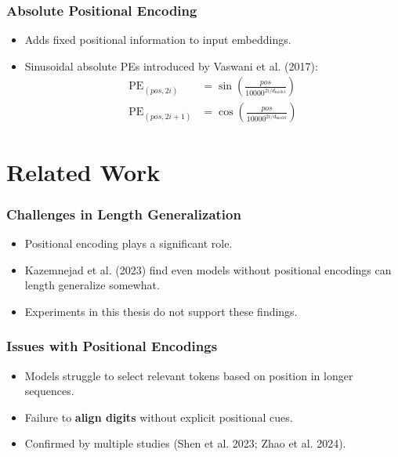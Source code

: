 \documentclass[14pt,aspectratio=169]{beamer}
\theoremstyle{remark}
\begin{document}
\begin{frame}
    \frametitle{Absolute Positional Encoding}
    \begin{itemize}
        \item Adds fixed positional information to input embeddings.
        \item Sinusoidal absolute PEs introduced by Vaswani et al. (2017):
              \[
                  \begin{aligned}
                      \text{PE}_{(pos, 2i)}   & = \sin\left( \frac{pos}{10000^{2i / d_{\text{model}}}} \right) \\
                      \text{PE}_{(pos, 2i+1)} & = \cos\left( \frac{pos}{10000^{2i / d_{\text{model}}}} \right)
                  \end{aligned}
              \]
    \end{itemize}
\end{frame}

\section{Related Work}
\begin{frame}
    \frametitle{Challenges in Length Generalization}
    \begin{itemize}
        \item Positional encoding plays a significant role.
        \item Kazemnejad et al. (2023) find even models without positional encodings can length generalize somewhat.
        \item Experiments in this thesis do not support these findings.
    \end{itemize}
\end{frame}

\begin{frame}
    \frametitle{Issues with Positional Encodings}
    \begin{itemize}
        \item Models struggle to select relevant tokens based on position in longer sequences.
        \item Failure to \textbf{align digits} without explicit positional cues.
        \item Confirmed by multiple studies (Shen et al. 2023; Zhao et al. 2024).
    \end{itemize}
\end{frame}
\end{document}
